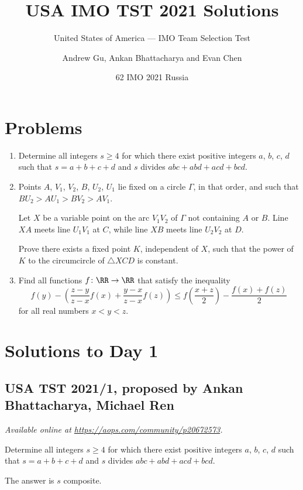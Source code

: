 \documentclass[11pt]{scrartcl}
\begin{document}
\title{USA IMO TST 2021 Solutions}
\subtitle{United States of America --- IMO Team Selection Test}
\author{Andrew Gu, Ankan Bhattacharya and Evan Chen}
\date{62 IMO 2021 Russia}

\maketitle

\tableofcontents
\newpage

\addtocounter{section}{-1}
\section{Problems}
\begin{enumerate}[\bfseries 1.]
\item %
Determine all integers $s \ge 4$
for which there exist positive integers $a$, $b$, $c$, $d$
such that $s = a+b+c+d$
and $s$ divides $abc+abd+acd+bcd$.

\item %
Points $A$, $V_1$, $V_2$, $B$, $U_2$, $U_1$
lie fixed on a circle $\Gamma$, in that order,
and such that $BU_2 > AU_1 > BV_2 > AV_1$.

Let $X$ be a variable point on the arc $V_1 V_2$ of $\Gamma$
not containing $A$ or $B$.
Line $XA$ meets line $U_1 V_1$ at $C$,
while line $XB$ meets line $U_2 V_2$ at $D$.

Prove there exists a fixed point $K$, independent of $X$,
such that the power of $K$ to the circumcircle
of $\triangle XCD$ is constant.

\item %
Find all functions $f \colon \RR \to \RR$ that satisfy the inequality
\[
  f(y) -
  \left(\frac{z-y}{z-x} f(x) + \frac{y-x}{z-x}f(z)\right) \leq
  f\left(\frac{x+z}{2}\right) - \frac{f(x)+f(z)}{2}
\]
for all real numbers $x < y < z$.

\end{enumerate}
\pagebreak

\section{Solutions to Day 1}
\subsection{USA TST 2021/1, proposed by Ankan Bhattacharya, Michael Ren}
\textsl{Available online at \url{https://aops.com/community/p20672573}.}
\begin{mdframed}[style=mdpurplebox,frametitle={Problem statement}]
Determine all integers $s \ge 4$
for which there exist positive integers $a$, $b$, $c$, $d$
such that $s = a+b+c+d$
and $s$ divides $abc+abd+acd+bcd$.
\end{mdframed}
The answer is $s$ composite.
\end{document}
